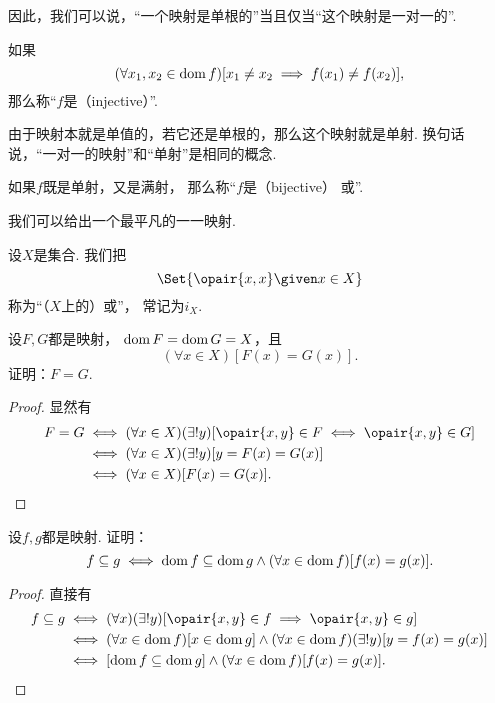因此，我们可以说，“一个映射是单根的”当且仅当“这个映射是一对一的”.

如果\[
	(\forall x_1, x_2 \in \operatorname{dom} f)
	[x_1 \neq x_2 \implies f(x_1) \neq f(x_2)],
\]
那么称“\(f\)是（injective）”.

由于映射本就是单值的，若它还是单根的，那么这个映射就是单射.
换句话说，“一对一的映射”和“单射”是相同的概念.

如果\(f\)既是单射，又是满射，
那么称“\(f\)是（bijective）
或”.

我们可以给出一个最平凡的一一映射.
\begin{definition}
设\(X\)是集合.
我们把\[
	\Set{ \opair{x,x} \given x \in X }
\]称为“（\(X\)上的）或”，
常记为\(i_X\).
\end{definition}

\begin{example}
设\(F,G\)都是映射，
\(\operatorname{dom} F = \operatorname{dom} G = X\)，且\[
	(\forall x \in X)[F(x) = G(x)].
\]
证明：\(F=G\).
\begin{proof}
显然有
\begin{align*}
	F=G
	&\iff (\forall x \in X)(\exists!y)[
		\opair{x,y} \in F
		\iff
		\opair{x,y} \in G
	] \\
	&\iff (\forall x \in X)(\exists!y)[
		y = F(x) = G(x)
	] \\
	&\iff (\forall x \in X)[F(x) = G(x)].
	\qedhere
\end{align*}
\end{proof}
\end{example}

\begin{example}
设\(f,g\)都是映射.
证明：\[
	f \subseteq g
	\iff
	\operatorname{dom} f \subseteq \operatorname{dom} g
	\land
	(\forall x \in \operatorname{dom} f)
	[f(x) = g(x)].
\]
\begin{proof}
直接有
\begin{align*}
	f \subseteq g
	&\iff (\forall x)(\exists!y)[\opair{x,y} \in f \implies \opair{x,y} \in g] \\
	&\iff (\forall x \in \dom f)[x \in \dom g]\land(\forall x \in \dom f)(\exists!y)[y=f(x)=g(x)] \\
	&\iff [\dom f \subseteq \dom g]\land(\forall x \in \dom f)[f(x)=g(x)].
	\qedhere
\end{align*}
\end{proof}
\end{example}

